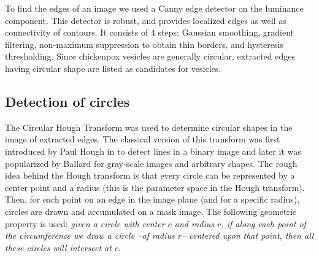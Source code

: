 \documentclass[oribibl]{llncs}
\begin{document}
To find the edges of an image we used a Canny edge detector \cite{JC01} on the luminance component. This detector is robust, and provides localized edges as well as connectivity of contours. 
It consists of 4 steps: Gaussian smoothing, gradient filtering, non-maximum suppression to obtain thin borders, and hysteresis thresholding.
Since chickenpox  vesicles are generally circular, extracted edges having circular shape are listed as candidates for vesicles.  
%
%
%
\subsection{Detection of circles}
The Circular Hough Transform was used to determine circular shapes in the
image of extracted edges. The classical version of this transform was first
introduced by Paul Hough in \cite{HO01} to detect lines in a binary image
and later it was popularized by Ballard \cite{BA81} for gray-scale images and arbitrary shapes. The rough idea behind the Hough transform is that every circle can be represented by a
center point and a radius (this is the parameter space in the Hough
transform). Then, for each point on an edge in the image plane (and for a
specific radius), circles are drawn and accumulated on a mask image. The following geometric property is used: %
\emph{given a circle with center $c$ and radius $r$, if along each point of the circumference we draw a circle --of radius  $r$-- centered upon that point, then all these  
circles will intersect at $c$}. 
\end{document}
